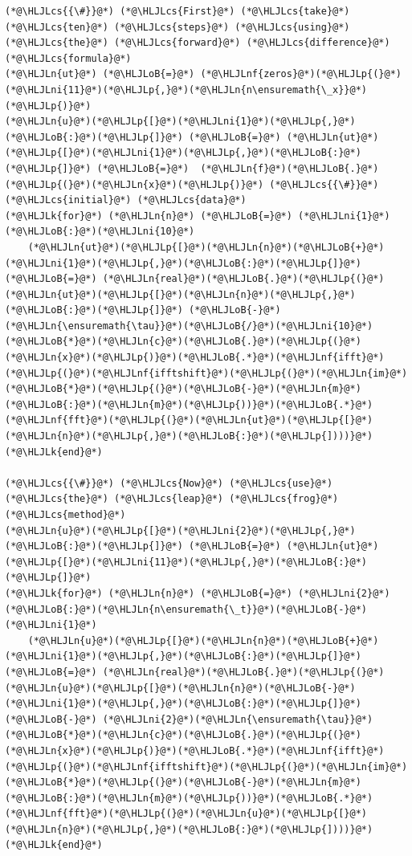 \documentclass[12pt,landscape]{article}
\newcommand{\HLJLk}[1]{\textcolor[RGB]{148,91,176}{\textbf{#1}}}
\newcommand{\HLJLn}[1]{#1}
\newcommand{\HLJLnf}[1]{\textcolor[RGB]{66,102,213}{#1}}
\newcommand{\HLJLni}[1]{\textcolor[RGB]{59,151,46}{#1}}
\newcommand{\HLJLoB}[1]{\textcolor[RGB]{102,102,102}{\textbf{#1}}}
\newcommand{\HLJLp}[1]{#1}
\newcommand{\HLJLcs}[1]{\textcolor[RGB]{153,153,119}{\textit{#1}}}
\begin{document}
{\begin{lstlisting}
(*@\HLJLcs{{\#}}@*) (*@\HLJLcs{First}@*) (*@\HLJLcs{take}@*) (*@\HLJLcs{ten}@*) (*@\HLJLcs{steps}@*) (*@\HLJLcs{using}@*) (*@\HLJLcs{the}@*) (*@\HLJLcs{forward}@*) (*@\HLJLcs{difference}@*) (*@\HLJLcs{formula}@*)
(*@\HLJLn{ut}@*) (*@\HLJLoB{=}@*) (*@\HLJLnf{zeros}@*)(*@\HLJLp{(}@*)(*@\HLJLni{11}@*)(*@\HLJLp{,}@*)(*@\HLJLn{n\ensuremath{\_x}}@*)(*@\HLJLp{)}@*)
(*@\HLJLn{u}@*)(*@\HLJLp{[}@*)(*@\HLJLni{1}@*)(*@\HLJLp{,}@*)(*@\HLJLoB{:}@*)(*@\HLJLp{]}@*) (*@\HLJLoB{=}@*) (*@\HLJLn{ut}@*)(*@\HLJLp{[}@*)(*@\HLJLni{1}@*)(*@\HLJLp{,}@*)(*@\HLJLoB{:}@*)(*@\HLJLp{]}@*) (*@\HLJLoB{=}@*)  (*@\HLJLn{f}@*)(*@\HLJLoB{.}@*)(*@\HLJLp{(}@*)(*@\HLJLn{x}@*)(*@\HLJLp{)}@*) (*@\HLJLcs{{\#}}@*) (*@\HLJLcs{initial}@*) (*@\HLJLcs{data}@*)
(*@\HLJLk{for}@*) (*@\HLJLn{n}@*) (*@\HLJLoB{=}@*) (*@\HLJLni{1}@*)(*@\HLJLoB{:}@*)(*@\HLJLni{10}@*)
    (*@\HLJLn{ut}@*)(*@\HLJLp{[}@*)(*@\HLJLn{n}@*)(*@\HLJLoB{+}@*)(*@\HLJLni{1}@*)(*@\HLJLp{,}@*)(*@\HLJLoB{:}@*)(*@\HLJLp{]}@*) (*@\HLJLoB{=}@*) (*@\HLJLn{real}@*)(*@\HLJLoB{.}@*)(*@\HLJLp{(}@*)(*@\HLJLn{ut}@*)(*@\HLJLp{[}@*)(*@\HLJLn{n}@*)(*@\HLJLp{,}@*)(*@\HLJLoB{:}@*)(*@\HLJLp{]}@*) (*@\HLJLoB{-}@*) (*@\HLJLn{\ensuremath{\tau}}@*)(*@\HLJLoB{/}@*)(*@\HLJLni{10}@*)(*@\HLJLoB{*}@*)(*@\HLJLn{c}@*)(*@\HLJLoB{.}@*)(*@\HLJLp{(}@*)(*@\HLJLn{x}@*)(*@\HLJLp{)}@*)(*@\HLJLoB{.*}@*)(*@\HLJLnf{ifft}@*)(*@\HLJLp{(}@*)(*@\HLJLnf{ifftshift}@*)(*@\HLJLp{(}@*)(*@\HLJLn{im}@*)(*@\HLJLoB{*}@*)(*@\HLJLp{(}@*)(*@\HLJLoB{-}@*)(*@\HLJLn{m}@*)(*@\HLJLoB{:}@*)(*@\HLJLn{m}@*)(*@\HLJLp{))}@*)(*@\HLJLoB{.*}@*)(*@\HLJLnf{fft}@*)(*@\HLJLp{(}@*)(*@\HLJLn{ut}@*)(*@\HLJLp{[}@*)(*@\HLJLn{n}@*)(*@\HLJLp{,}@*)(*@\HLJLoB{:}@*)(*@\HLJLp{])))}@*)
(*@\HLJLk{end}@*)

(*@\HLJLcs{{\#}}@*) (*@\HLJLcs{Now}@*) (*@\HLJLcs{use}@*) (*@\HLJLcs{the}@*) (*@\HLJLcs{leap}@*) (*@\HLJLcs{frog}@*) (*@\HLJLcs{method}@*)
(*@\HLJLn{u}@*)(*@\HLJLp{[}@*)(*@\HLJLni{2}@*)(*@\HLJLp{,}@*)(*@\HLJLoB{:}@*)(*@\HLJLp{]}@*) (*@\HLJLoB{=}@*) (*@\HLJLn{ut}@*)(*@\HLJLp{[}@*)(*@\HLJLni{11}@*)(*@\HLJLp{,}@*)(*@\HLJLoB{:}@*)(*@\HLJLp{]}@*)
(*@\HLJLk{for}@*) (*@\HLJLn{n}@*) (*@\HLJLoB{=}@*) (*@\HLJLni{2}@*)(*@\HLJLoB{:}@*)(*@\HLJLn{n\ensuremath{\_t}}@*)(*@\HLJLoB{-}@*)(*@\HLJLni{1}@*)
    (*@\HLJLn{u}@*)(*@\HLJLp{[}@*)(*@\HLJLn{n}@*)(*@\HLJLoB{+}@*)(*@\HLJLni{1}@*)(*@\HLJLp{,}@*)(*@\HLJLoB{:}@*)(*@\HLJLp{]}@*) (*@\HLJLoB{=}@*) (*@\HLJLn{real}@*)(*@\HLJLoB{.}@*)(*@\HLJLp{(}@*)(*@\HLJLn{u}@*)(*@\HLJLp{[}@*)(*@\HLJLn{n}@*)(*@\HLJLoB{-}@*)(*@\HLJLni{1}@*)(*@\HLJLp{,}@*)(*@\HLJLoB{:}@*)(*@\HLJLp{]}@*) (*@\HLJLoB{-}@*) (*@\HLJLni{2}@*)(*@\HLJLn{\ensuremath{\tau}}@*)(*@\HLJLoB{*}@*)(*@\HLJLn{c}@*)(*@\HLJLoB{.}@*)(*@\HLJLp{(}@*)(*@\HLJLn{x}@*)(*@\HLJLp{)}@*)(*@\HLJLoB{.*}@*)(*@\HLJLnf{ifft}@*)(*@\HLJLp{(}@*)(*@\HLJLnf{ifftshift}@*)(*@\HLJLp{(}@*)(*@\HLJLn{im}@*)(*@\HLJLoB{*}@*)(*@\HLJLp{(}@*)(*@\HLJLoB{-}@*)(*@\HLJLn{m}@*)(*@\HLJLoB{:}@*)(*@\HLJLn{m}@*)(*@\HLJLp{))}@*)(*@\HLJLoB{.*}@*)(*@\HLJLnf{fft}@*)(*@\HLJLp{(}@*)(*@\HLJLn{u}@*)(*@\HLJLp{[}@*)(*@\HLJLn{n}@*)(*@\HLJLp{,}@*)(*@\HLJLoB{:}@*)(*@\HLJLp{])))}@*)
(*@\HLJLk{end}@*)
\end{lstlisting}


}
\end{document}

